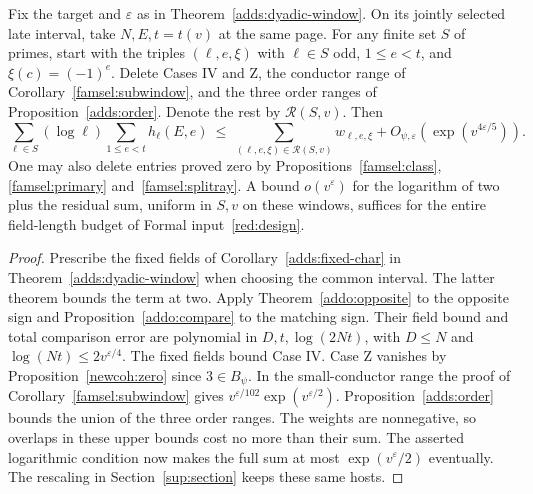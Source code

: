 \begin{corollary}\label{addo:remainder}
Fix the target and \(\varepsilon\) as in Theorem~\ref{adds:dyadic-window}.
On its jointly selected late interval, take \(N,E,t=t(v)\) at the
same page. For any finite set \(S\) of primes, start with the triples
\((\ell,e,\xi)\) with \(\ell\in S\) odd, \(1\le e<t\), and
\(\xi(c)=(-1)^e\). Delete Cases IV and Z, the conductor range of
Corollary~\ref{famsel:subwindow}, and the three order ranges of
Proposition~\ref{adds:order}. Denote the rest by \(\mathcal R(S,v)\).
Then
\[
 \sum_{\ell\in S}(\log\ell)\sum_{1\le e<t} h_\ell(E,e)
 \ \le\ \sum_{(\ell,e,\xi)\in\mathcal R(S,v)}w_{\ell,e,\xi}
        +O_{\psi,\varepsilon}\!\left(\exp(v^{4\varepsilon/5})\right).
\]
One may also delete entries proved zero by
Propositions~\ref{famsel:class}, \ref{famsel:primary} and~\ref{famsel:splitray}.
A bound \(o(v^\varepsilon)\) for the logarithm
of two plus the residual sum, uniform in \(S,v\) on these windows, suffices
for the entire field-length budget of Formal input~\ref{red:design}.
\end{corollary}
\begin{proof}
Prescribe the fixed fields of Corollary~\ref{adds:fixed-char} in
Theorem~\ref{adds:dyadic-window} when choosing the common interval.
The latter theorem bounds the term at two. Apply Theorem~\ref{addo:opposite}
to the opposite sign and Proposition~\ref{addo:compare} to the matching
sign. Their field bound and total comparison error are polynomial in
\(D,t,\log(2Nt)\), with \(D\le N\) and \(\log(Nt)\le 2v^{\varepsilon/4}\).
The fixed fields bound Case IV. Case Z vanishes by
Proposition~\ref{newcoh:zero} since \(3\in B_\psi\).
In the small-conductor range the proof of Corollary~\ref{famsel:subwindow}
gives \(v^{\varepsilon/102}\exp(v^{\varepsilon/2})\).
Proposition~\ref{adds:order} bounds the union of the three order
ranges. The weights are nonnegative, so overlaps in these upper bounds
cost no more than their sum. The asserted logarithmic condition now
makes the full sum at most \(\exp(v^\varepsilon/2)\) eventually.
The rescaling in Section~\ref{sup:section} keeps these same hosts.
\end{proof}
